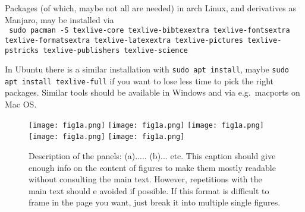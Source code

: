 Packages (of which, maybe not all are needed) in arch Linux, and derivatives as Manjaro, may be installed via\\
\texttt{
  sudo pacman -S texlive-core texlive-bibtexextra texlive-fontsextra  texlive-formatsextra texlive-latexextra texlive-pictures texlive-pstricks texlive-publishers  texlive-science}

\vspace{0.2cm}
In Ubuntu there is a similar installation with \texttt{sudo apt install}, maybe \texttt{sudo apt install texlive-full} if you want to lose less time to pick the right packages. Similar tools should be available in Windows and via e.g.~macports on Mac OS.

\begin{figure*}[!tb]
  \centering
  \texttt{[image: fig1a.png]}
  \hskip 1mm
  \texttt{[image: fig1a.png]}
  \hskip 1mm
  \texttt{[image: fig1a.png]}
  \vskip 1mm
  \texttt{[image: fig1a.png]}
  \hskip 1mm
  \texttt{[image: fig1a.png]}
  \caption{Description of the panels: (a)..... (b)... etc. This caption should give enough info on the content of figures to make them mostly readable without consulting the main text. However, repetitions with the main text should e avoided if possible. {\color{red} If this format is difficult to frame in the page you want, just break it into multiple single figures.}}
  \label{fig:x}
\end{figure*}
